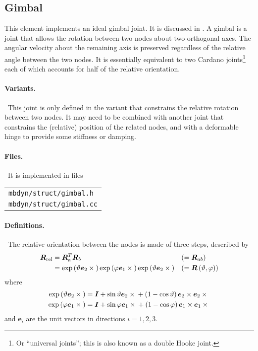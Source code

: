 \documentclass[10pt,dvips,fleqn,subeqn]{report}
\newcommand{\T}[1]{\bm{#1}}
\begin{document}
\subsection{Gimbal}
\label{sec:GimbalRotationJoint}
This element implements an ideal gimbal joint.
It is discussed in \cite{GIMBAL-2008}.
A gimbal is a joint that allows the rotation between two nodes
about two orthogonal axes.
The angular velocity about the remaining axis is preserved regardless
of the relative angle between the two nodes.
It is essentially equivalent to two Cardano joints\footnote{Or
``universal joints''; this is also known as a double Hooke joint.}
each of which accounts for half of the relative orientation.

\paragraph{Variants.} \
This joint is only defined in the variant that constrains the relative
rotation between two nodes.
It may need to be combined with another joint that constrains
the (relative) position of the related nodes,
and with a deformable hinge to provide some stiffness or damping.

\paragraph{Files.} \
It is implemented in files

\begin{tabular}{l}
\texttt{mbdyn/struct/gimbal.h} \\
\texttt{mbdyn/struct/gimbal.cc}
\end{tabular}

\paragraph{Definitions.} \
The relative orientation between the nodes is made of three steps,
described by
\begin{subequations}
\begin{align}
	\T{R}_{\text{rel}}
	&= \T{R}_a^T \T{R}_b & & ( = \T{R}_{ab} )
	\label{eq:gimbal:R_a_b} \\
	&= \llk{exp}\plbr{\vartheta \T{e}_2 \times{}}
		\llk{exp}\plbr{\varphi \T{e}_1 \times{}}
		\llk{exp}\plbr{\vartheta \T{e}_2 \times{}}
	& & ( = \T{R}\plbr{\vartheta, \varphi} )
	\label{eq:gimbal:R_theta_phi}
\end{align}
\end{subequations}
where
\begin{subequations}
\begin{align}
	\llk{exp}\plbr{\vartheta \T{e}_2 \times{}} &=
		\T{I} + \sin\vartheta \T{e}_2\times{}
			+ \plbr{1 - \cos\vartheta}\T{e}_2\times\T{e}_2\times{}
		\label{eq:GIMBAL-EXP-THETA} \\
	\llk{exp}\plbr{\varphi \T{e}_1 \times{}} &=
		\T{I} + \sin\varphi \T{e}_1\times{}
			+ \plbr{1 - \cos\varphi}\T{e}_1\times\T{e}_1\times{}
		\label{eq:GIMBAL-EXP-PHI}
\end{align}
\end{subequations}
and $\T{e}_i$ are the unit vectors in directions $i=1,2,3$.
\end{document}
